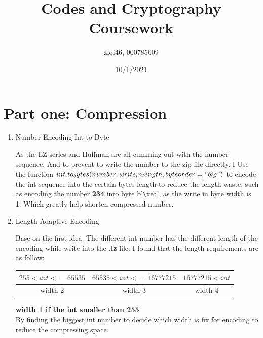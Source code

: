\documentclass[margin 2cm]{report}
\title{\textbf{Codes and Cryptography Coursework}}
\author{zlqf46, 000785609}
\date{10/1/2021}
\begin{document}
\maketitle
\section[1]{\Large Part one: Compression}
\begin{enumerate}
\normalsize\item[1)]{Number Encoding Int to Byte}
\begin{spacing}{1.5}
\normalsize\indent\setlength{\parindent}{2em}As the LZ series and Huffman are all cumming out with the number sequence. And to prevent to write the number to the zip file directly. I Use the function $int.to_bytes(number, write_in_length, byteorder="big")$ to encode the int sequence into the certain bytes length to reduce the length waste, such as encoding the number \textbf{234} into byte b'\verb|\|xea', as the write in byte width is 1. Which greatly help shorten compressed number.
\end{spacing}

\normalsize\item[2)]{Length Adaptive Encoding}
\begin{spacing}{1.5}
\normalsize\indent\setlength{\parindent}{2em}Base on the first idea. The different int number has the different length of the encoding while write into the \textbf{.lz} file. I found that the length requirements are as follow:
\newline
\newline
\begin{tabular}{|c|c|c|}
\hline
$255<int<=65535$&$65535<int<=16777215$&$16777215<int$\\
\hline
width 2&width 3&width 4\\
\hline
\end{tabular}
\newline\normalsize\textbf{width 1 if the int smaller than 255}\\
By finding the biggest int number to decide which width is fix for encoding to reduce the compressing space.
\end{spacing}


\end{enumerate}
\end{document}
